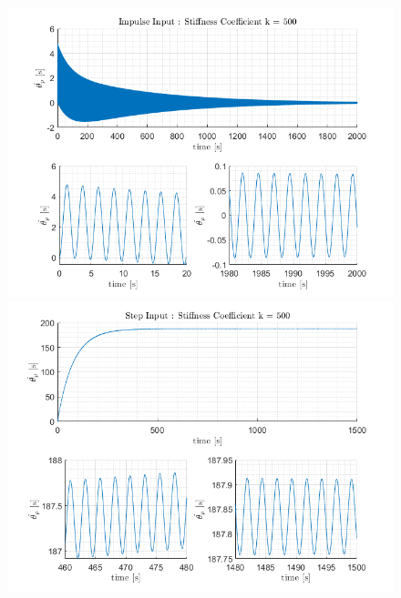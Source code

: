 \documentclass[letterpaper,12pt]{article}
\begin{document}
\begin{figure}[ht]
    \centering
    \includegraphics[scale = .8]{Images/Impulse_k500.png}
    \includegraphics[scale = .8]{Images/StepInput_k500.png}
\end{figure}
\end{document}

